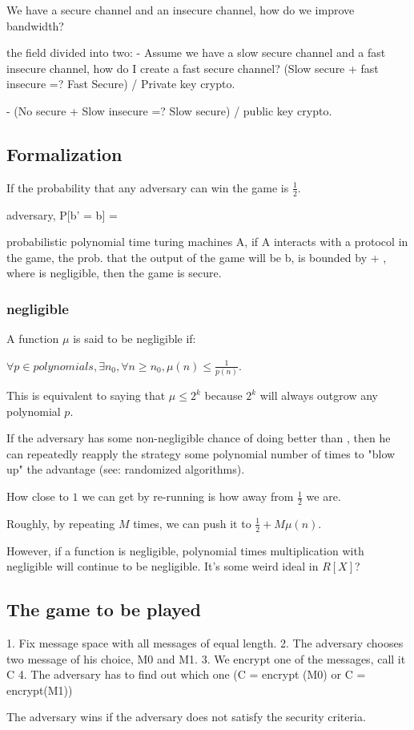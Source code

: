 We have a secure channel and an insecure channel, how do we improve 
bandwidth?

the field divided into two:
- Assume we have a slow secure channel and a fast insecure channel, how do I create
a fast secure channel? (Slow secure + fast insecure =? Fast Secure) / Private key crypto.

- (No secure + Slow insecure =? Slow secure) / public key crypto.

\subsection{Formalization}

If the probability that any adversary can win the game is $\frac{1}{2}$.

\forall adversary, P[b' = b] = 


\forall probabilistic polynomial time turing machines A, if A interacts with a protocol in the game,
the prob. that the output of the game will be b, is bounded by  + \mu, where \mu
is negligible, then the game is secure.


\subsubsection{negligible}
A function $\mu$ is said to be negligible if:


$\forall p \in polynomials, \exists n_0, \forall n \geq n_0, \mu(n) \leq \frac{1}{p(n)}$.

This is equivalent to saying that $\mu \leq 2^k$ because $2^k$ will always
outgrow any polynomial $p$.

If the adversary has some non-negligible chance of doing better than
, then he can repeatedly reapply the strategy some polynomial number
of times to "blow up" the advantage (see: randomized algorithms).

How close to $1$ we can get by re-running is how away from $\frac{1}{2}$ we are.

Roughly, by repeating $M$ times, we can push it to $\frac{1}{2} + M \mu(n)$.


However, if a function is negligible, polynomial times multiplication with
negligible will continue to be negligible. It's some weird ideal in $R[X]$? 


\subsection{The game to be played}

1. Fix message space with all messages of equal length.
2. The adversary chooses two message of his choice, M0 and M1.
3. We encrypt one of the messages, call it C
4. The adversary has to find out which one (C = encrypt (M0) or C = encrypt(M1))

The adversary wins if  the adversary does not satisfy the security criteria.
